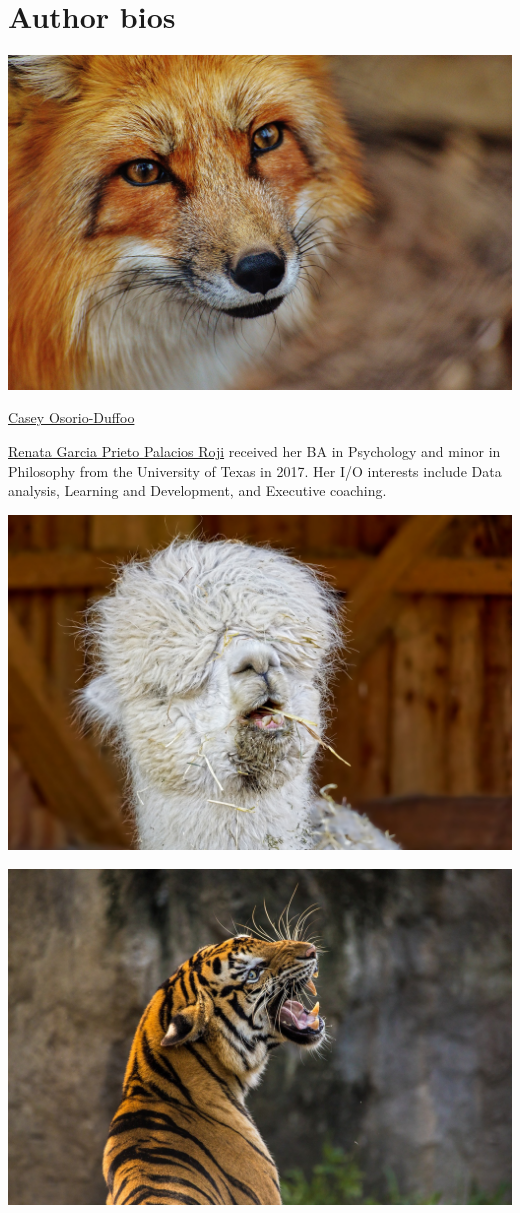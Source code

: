\documentclass[
]{book}
\begin{document}
\hypertarget{author-bios}{%
\chapter{Author bios}\label{author-bios}}

\includegraphics{casey.jpg}

\href{mailto:osorioduffc1@montclair.edu}{Casey Osorio-Duffoo}

\href{mailto:garciaprier1@mail.montclair.edu}{Renata Garcia Prieto Palacios Roji} received her BA in Psychology and minor in Philosophy from the University of Texas in 2017. Her I/O interests include Data analysis, Learning and Development, and Executive coaching.

\includegraphics{renata.jpg}

\includegraphics{kulas.jpg}
\end{document}
